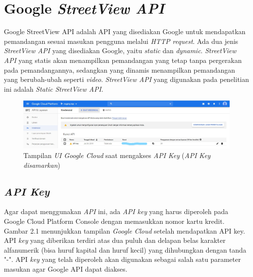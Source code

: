 \section{Google \it{StreetView API}}
\label{sec:streetview}
Google StreetView API adalah API yang disediakan Google untuk mendapatkan pemandangan sesuai masukan pengguna melalui \textit{HTTP request}. Ada dua jenis {\it StreetView API} yang disediakan Google, yaitu {\it static} dan {\it dynamic}. {\it StreetView API} yang statis akan menampilkan pemandangan yang tetap tanpa pergerakan pada pemandangannya, sedangkan yang dinamis menampilkan pemandangan yang berubah-ubah seperti {\it video}. {\it StreetView API} yang digunakan pada penelitian ini adalah {\it Static StreetView API}.


\begin{figure}[h]
	\centering
		\includegraphics[width=6in]{Gambar/google_cloud.png}
	\caption{Tampilan \textit{UI Google Cloud} saat mengakses \textit{API Key} (\textit{API Key disamarkan})}
	\label{fig:googlecloud}
\end{figure}

\subsection{{\it API Key}}
\label{subs:api-key}
Agar dapat menggunakan {\it API} ini, ada {\it API key} yang harus diperoleh pada Google Cloud Platform Console dengan memasukkan nomor kartu kredit. Gambar 2.1 menunjukkan tampilan \textit{Google Cloud} setelah mendapatkan API key. API {\it key} yang diberikan terdiri atas dua puluh dan delapan belas karakter alfanumerik (bisa huruf kapital dan huruf kecil) yang dihubungkan dengan tanda "-". API {\it key} yang telah diperoleh akan digunakan sebagai salah satu parameter masukan agar Google API dapat diakses.

